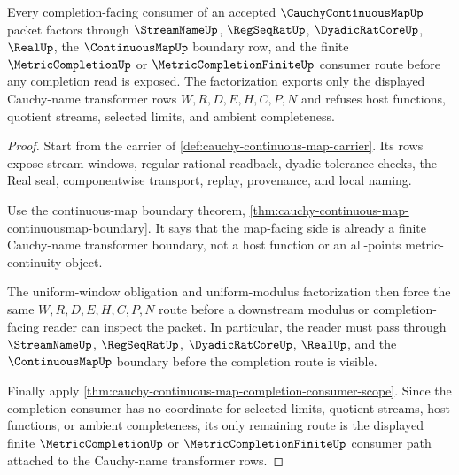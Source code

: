 \begin{theorem}
\label{thm:cauchy-continuous-map-completion-factorization}
Every completion-facing consumer of an accepted $\CauchyContinuousMapUp$ packet factors through $\StreamNameUp$, $\RegSeqRatUp$, $\DyadicRatCoreUp$, $\RealUp$, the $\ContinuousMapUp$ boundary row, and the finite $\MetricCompletionUp$ or $\MetricCompletionFiniteUp$ consumer route before any completion read is exposed. The factorization exports only the displayed Cauchy-name transformer rows $W,R,D,E,H,C,P,N$ and refuses host functions, quotient streams, selected limits, and ambient completeness.
\end{theorem}
\begin{proof}
Start from the carrier of \autoref{def:cauchy-continuous-map-carrier}. Its rows expose stream windows, regular rational readback, dyadic tolerance checks, the Real seal, componentwise transport, replay, provenance, and local naming.

Use the continuous-map boundary theorem, \autoref{thm:cauchy-continuous-map-continuousmap-boundary}. It says that the map-facing side is already a finite Cauchy-name transformer boundary, not a host function or an all-points metric-continuity object.

The uniform-window obligation and uniform-modulus factorization then force the same $W,R,D,E,H,C,P,N$ route before a downstream modulus or completion-facing reader can inspect the packet. In particular, the reader must pass through $\StreamNameUp$, $\RegSeqRatUp$, $\DyadicRatCoreUp$, $\RealUp$, and the $\ContinuousMapUp$ boundary before the completion route is visible.

Finally apply \autoref{thm:cauchy-continuous-map-completion-consumer-scope}. Since the completion consumer has no coordinate for selected limits, quotient streams, host functions, or ambient completeness, its only remaining route is the displayed finite $\MetricCompletionUp$ or $\MetricCompletionFiniteUp$ consumer path attached to the Cauchy-name transformer rows.
\end{proof}

